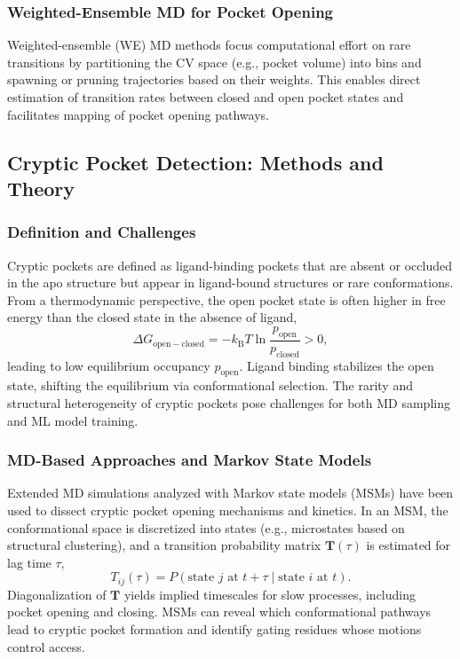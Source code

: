 \documentclass[12pt,a4paper]{article}
\begin{document}
\subsubsection{Weighted-Ensemble MD for Pocket Opening}

Weighted-ensemble (WE) MD methods focus computational effort on rare transitions by partitioning the CV space (e.g., pocket volume) into bins and spawning or pruning trajectories based on their weights. This enables direct estimation of transition rates between closed and open pocket states and facilitates mapping of pocket opening pathways.\cite{CH5_Gasparikova2025,CH5_zhang2026decrypting}

\subsection{Cryptic Pocket Detection: Methods and Theory}
\label{sec:cryptic_pockets}

\subsubsection{Definition and Challenges}

Cryptic pockets are defined as ligand-binding pockets that are absent or occluded in the apo structure but appear in ligand-bound structures or rare conformations.\cite{CH5_Kuzmanic2020,CH5_amaro2019will,CH5_Gasparikova2025} From a thermodynamic perspective, the open pocket state is often higher in free energy than the closed state in the absence of ligand,
\begin{equation}
\Delta G_{\mathrm{open-closed}} = -k_{\mathrm{B}} T \ln \frac{p_{\mathrm{open}}}{p_{\mathrm{closed}}} > 0,
\label{eq:open_closed}
\end{equation}
leading to low equilibrium occupancy \(p_{\mathrm{open}}\). Ligand binding stabilizes the open state, shifting the equilibrium via conformational selection. The rarity and structural heterogeneity of cryptic pockets pose challenges for both MD sampling and ML model training.\cite{CH5_Kuzmanic2020,CH5_Gasparikova2025}

\subsubsection{MD-Based Approaches and Markov State Models}

Extended MD simulations analyzed with Markov state models (MSMs) have been used to dissect cryptic pocket opening mechanisms and kinetics.\cite{CH5_Kuzmanic2020,CH5_Gasparikova2025} In an MSM, the conformational space is discretized into states (e.g., microstates based on structural clustering), and a transition probability matrix \(\mathbf{T}(\tau)\) is estimated for lag time \(\tau\),
\begin{equation}
T_{ij}(\tau) = P(\text{state } j \text{ at } t + \tau \mid \text{state } i \text{ at } t).
\label{eq:msm}
\end{equation}
Diagonalization of \(\mathbf{T}\) yields implied timescales for slow processes, including pocket opening and closing. MSMs can reveal which conformational pathways lead to cryptic pocket formation and identify gating residues whose motions control access.\cite{CH5_Kuzmanic2020}
\end{document}
